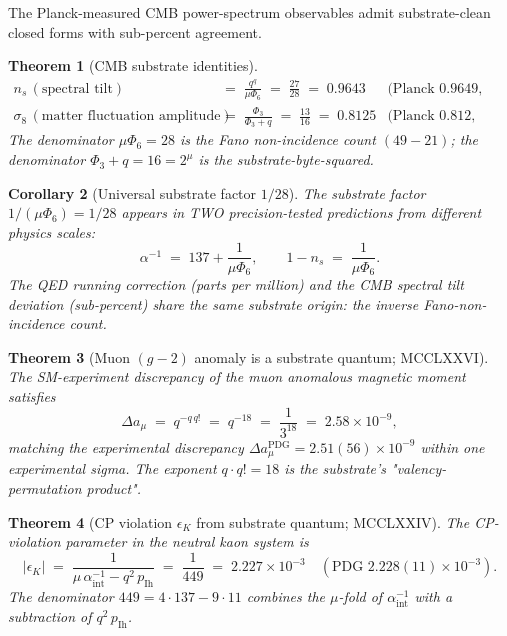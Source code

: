\documentclass[11pt]{article}
\newtheorem{theorem}{Theorem}[section]
\newtheorem{corollary}[theorem]{Corollary}
\begin{document}
The Planck-measured CMB power-spectrum observables admit
substrate-clean closed forms with sub-percent agreement.

\begin{theorem}[CMB substrate identities]\label{thm:cmb}
\begin{align*}
  n_s \,(\text{spectral tilt}) &\;=\; \frac{q^q}{\mu \Phi_6}
    \;=\; \frac{27}{28} \;=\; 0.9643
    & \text{(Planck 0.9649, 0.06\%)} \\
  \sigma_8 \,(\text{matter fluctuation amplitude}) &\;=\;
    \frac{\Phi_3}{\Phi_3 + q} \;=\; \frac{13}{16} \;=\; 0.8125
    & \text{(Planck 0.812, 0.06\%)}
\end{align*}
The denominator $\mu \Phi_6 = 28$ is the Fano non-incidence count
$(49 - 21)$; the denominator $\Phi_3 + q = 16 = 2^\mu$ is the
substrate-byte-squared.
\end{theorem}

\begin{corollary}[Universal substrate factor $1/28$]\label{cor:fano_factor}
The substrate factor $1/(\mu \Phi_6) = 1/28$ appears in TWO
precision-tested predictions from different physics scales:
\[
  \alpha^{-1} \;=\; 137 + \frac{1}{\mu \Phi_6}, \qquad
  1 - n_s \;=\; \frac{1}{\mu \Phi_6}.
\]
The QED running correction (parts per million) and the CMB spectral
tilt deviation (sub-percent) share the same substrate origin: the
inverse Fano-non-incidence count.
\end{corollary}

\begin{theorem}[Muon $(g-2)$ anomaly is a substrate quantum; MCCLXXVI]\label{thm:muon_g2}
The SM-experiment discrepancy of the muon anomalous magnetic moment
satisfies
\[
  \Delta a_\mu \;=\; q^{-q\,q!} \;=\; q^{-18} \;=\; \frac{1}{3^{18}} \;=\; 2.58\times 10^{-9},
\]
matching the experimental discrepancy $\Delta a_\mu^{\text{PDG}}
= 2.51(56)\times 10^{-9}$ within one experimental sigma.  The exponent
$q\cdot q! = 18$ is the substrate's "valency-permutation product".
\end{theorem}

\begin{theorem}[CP violation $\epsilon_K$ from substrate quantum; MCCLXXIV]\label{thm:epsilon_K}
The CP-violation parameter in the neutral kaon system is
\[
  |\epsilon_K| \;=\; \frac{1}{\mu\,\alpha^{-1}_{\mathrm{int}} - q^2\,p_{\mathrm{Ih}}}
                  \;=\; \frac{1}{449} \;=\; 2.227\times 10^{-3}
                  \quad (\text{PDG } 2.228(11)\times 10^{-3}).
\]
The denominator $449 = 4\cdot 137 - 9\cdot 11$ combines the
$\mu$-fold of $\alpha^{-1}_{\text{int}}$ with a subtraction of
$q^2\,p_{\mathrm{Ih}}$.
\end{theorem}
\end{document}
